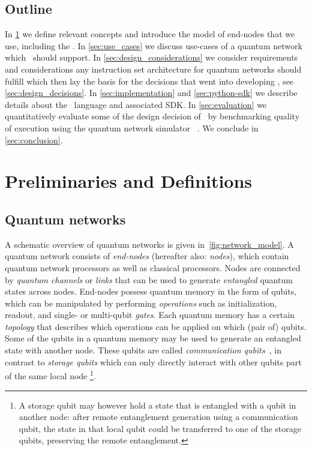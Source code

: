 \subsection{Outline}
In \cref{sec:preliminaries} we define relevant concepts and introduce the model of end-nodes that we use, including the \QNPU.
In \cref{sec:use_cases} we discuss use-cases of a quantum network which \netqasm\ should support.
In \cref{sec:design_considerations} we consider requirements and considerations any instruction set architecture for quantum networks should fulfill which then lay the basis for the decisions that went into developing \netqasm, see \cref{sec:design_decisions}.
In \cref{sec:implementation} and \cref{sec:python-sdk} we describe details about the \netqasm\ language and associated SDK.
In \cref{sec:evaluation} we quantitatively evaluate some of the design decision of \netqasm\ by benchmarking quality of execution using the quantum network simulator \netsquid~\cite{netsquid,coopmans2021netsquid}.
We conclude in \cref{sec:conclusion}.


\section{Preliminaries and Definitions}\label{sec:preliminaries}

\subsection{Quantum networks}
\label{sec:quantum_networks}
A schematic overview of quantum networks is given in~\cref{fig:network_model}.
A quantum network consists of \textit{end-nodes} (hereafter also: \textit{nodes}), which contain quantum network processors as well as classical processors.
Nodes are connected by \textit{quantum channels} or \textit{links} that can be used to generate \textit{entangled} quantum states across nodes.
End-nodes possess quantum memory in the form of qubits, which can be manipulated by performing \textit{operations} such as initialization, readout, and single- or multi-qubit \textit{gates}.
Each quantum memory has a certain \textit{topology} that describes which operations can be applied on which (pair of) qubits.
Some of the qubits in a quantum memory may be used to generate an entangled state with another node.
These qubits are called \emph{communication qubits}~\cite{dahlberg2019linklayer}, in contrast to \emph{storage qubits} which can only directly interact with other qubits part of the same local node
\footnote{A storage qubit may however hold a state that is entangled with a qubit in another node: after remote entanglement generation using a communication qubit, the state in that local qubit could be transferred to one of the storage qubits, preserving the remote entanglement.}.

